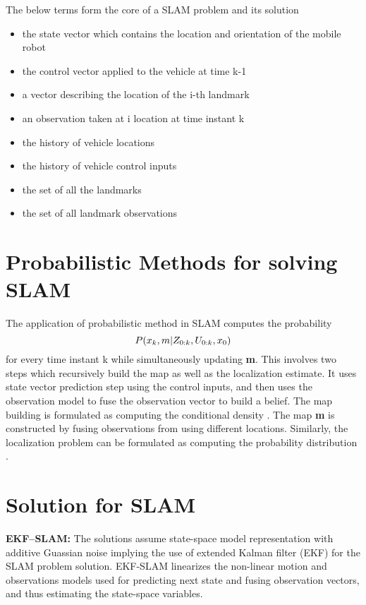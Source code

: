 \documentclass[conference]{IEEEtran}
\begin{document}
\par The below terms form the core of a SLAM problem and its solution
\begin{itemize}
  \item {} the state vector which contains the location and orientation of the mobile robot
  \item {} the control vector applied to the vehicle at time k-1
  \item {} a vector describing the location of the i-th landmark
  \item {} an observation taken at i location at time instant k
  \item {} the history of vehicle locations
  \item {} the history of vehicle control inputs
  \item {} the set of all the landmarks
  \item {} the set of all landmark observations
\end{itemize}

\section {Probabilistic Methods for solving SLAM}
The application of probabilistic method in SLAM computes the probability
\begin{equation}
\boldmath P(x_k,m|Z_{0:k}, U_{0:k}, x_0)
\end{equation}
for every time instant k while simultaneously updating \textbf{m}. This involves two steps which recursively build the map as well as the localization estimate. It uses state vector prediction step using the control inputs, and then uses the observation model to fuse the observation vector  to build a belief. The map building is formulated as computing the conditional density . The map \textbf{m} is constructed by fusing observations from using different locations. Similarly, the localization problem can be formulated as computing the probability distribution .

\section {Solution for SLAM}
\textbf{EKF--SLAM:} The solutions assume state-space model representation with additive Guassian noise implying the use of extended Kalman filter (EKF) for the SLAM problem solution. EKF-SLAM linearizes the non-linear motion and observations models used for predicting next state and fusing observation vectors, and thus estimating the state-space variables. 
\end{document}
